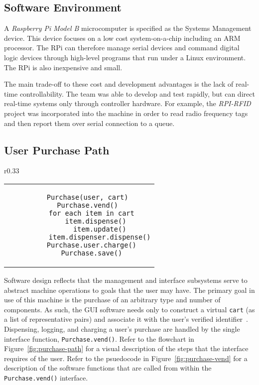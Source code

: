 \documentclass[12pt,oneside,final]{article}
\begin{document}
\subsection{Software Environment}
A \emph{Raspberry Pi Model B} microcomputer is specified as the Systems Management device. This device focuses on a low cost system-on-a-chip including an ARM processor. The RPi can therefore manage serial devices and command digital logic devices through high-level programs that run under a Linux environment. The RPi is also inexpensive and small.

The main trade-off to these cost and development advantages is the lack of real-time controllability. The team was able to develop and test rapidly, but can direct real-time systems only through controller hardware. For example, the \emph{RPI-RFID} project was incorporated into the machine in order to read radio frequency tags and then report them over serial connection to a queue.

\subsection{User Purchase Path}

\begin{wrapfigure}{r}{0.33\textwidth}%
  \centering%
  \begin{tabular}{c}%
  \begin{lstlisting}
    Purchase(user, cart)
    Purchase.vend()
      for each item in cart
        item.dispense()
          item.update()
          item.dispenser.dispense()
      Purchase.user.charge()
      Purchase.save()
  \end{lstlisting}
  \end{tabular}%
  \caption{\scriptsize Psuedocode for functions called by the \texttt{Purchase.vend()} interface}%
  \label{fig:purchase-vend}%
\end{wrapfigure}

Software design reflects that the management and interface subsystems serve to abstract machine operations to goals that the user may have. The primary goal in use of this machine is the purchase of an arbitrary type and number of components. As such, the GUI software needs only to construct a virtual \texttt{cart} (as a list of representative pairs) and associate it with the user's verified identifier~\cite{rpi_vend}. Dispensing, logging, and charging a user's purchase are handled by the single interface function, \texttt{Purchase.vend()}. Refer to the flowchart in Figure~\ref{fig:purchase-path} for a visual description of the steps that the interface requires of the user. Refer to the psuedocode in Figure~\ref{fig:purchase-vend} for a description of the software functions that are called from within the \texttt{Purchase.vend()} interface.
\end{document}
